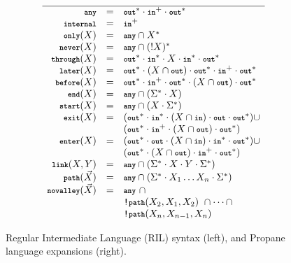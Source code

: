 \begin{figure}
\begin{minipage}[t]{.45\linewidth}
  \end{minipage}
  ~~
  \vrule
  ~~
  \begin{minipage}[t]{.5\linewidth}\small
  \vspace*{-1\baselineskip}
  \[\begin{array}{rcl}
    \hline
    \Any           & = & \Out^* \cdot \In^+ \cdot \Out^* \\
    \Internal      & = & \In^+ \\
    \Only(X)       & = & \Any \cap X^* \\
    \Never(X)      & = & \Any \cap (!X)^* \\
    \Through(X)    & = & \Out^* \cdot \In^* \cdot X \cdot \In^* \cdot \Out^* \\
    \Later(X)      & = & \Out^* \cdot (X \cap \Out) \cdot \Out^* \cdot \In^+ \cdot \Out^* \\
    \Before(X)     & = & \Out^* \cdot \In^+ \cdot \Out^* \cdot (X \cap \Out) \cdot \Out^* \\
    \End(X)        & = & \Any \cap (\Sigma^* \cdot X) \\
    \Start(X)      & = & \Any \cap (X \cdot \Sigma^*) \\
    \Exit(X)       & = & (\Out^* \cdot \In^* \cdot (X \cap \In) \cdot \Out \cdot \Out^*) \cup \\
                  &        & (\Out^* \cdot \In^+ \cdot (X \cap \Out) \cdot \Out^*) \\
    \Enter(X)      & = & (\Out^* \cdot \Out \cdot (X \cap \In) \cdot \In^* \cdot \Out^*) \cup \\
                  &        & (\Out^* \cdot (X \cap \Out) \cdot \In^+ \cdot \Out^*) \\
    \LinkKW(X,Y)     & = & \Any \cap (\Sigma^* \cdot X \cdot Y \cdot \Sigma^*) \\
    \PathKW(\vec{X}) & = & \Any \cap (\Sigma^* \cdot X_1 \dots X_n \cdot \Sigma^*) \\
    \Novalley(\vec{X}) & = & \Any ~ \cap \\
                  &   & \NOT\PathKW(X_2,X_1,X_2) ~ \cap \dots \cap \\
                  &   & \NOT\PathKW(X_n,X_{n-1},X_n) \\
  \end{array} \]

  \end{minipage}

  \hrulefill

  \caption{Regular Intermediate Language (RIL) syntax (left), and
           Propane language expansions (right).}
  \label{fig:rir-syntax}
  \vspace{-1em}
\end{figure}

